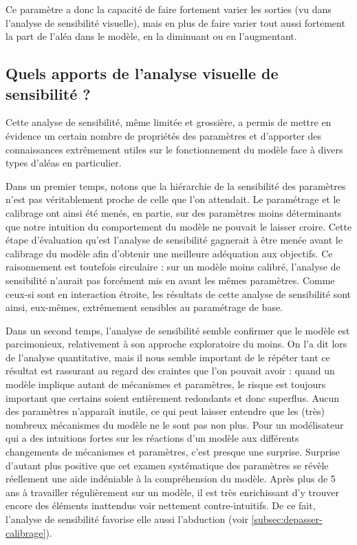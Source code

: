 Ce paramètre a donc la capacité de faire fortement varier les sorties (vu dans l'analyse de sensibilité visuelle), mais en plus de faire varier tout aussi fortement la part de l'aléa dans le modèle, en la diminuant ou en l'augmentant.

\subsection{Quels apports de l'analyse visuelle de sensibilité ?}

Cette analyse de sensibilité, même limitée et grossière, a permis de mettre en évidence un certain nombre de propriétés des paramètres et d'apporter des connaissances extrêmement utiles sur le fonctionnement du modèle face à divers types d'aléas en particulier.

Dans un premier temps, notons que la hiérarchie de la sensibilité des paramètres n'est pas véritablement proche de celle que l'on attendait.
Le paramétrage et le calibrage ont ainsi été menés, en partie, sur des paramètres moins déterminants que notre intuition du comportement du modèle ne pouvait le laisser croire.
Cette étape d'évaluation qu'est l'analyse de sensibilité gagnerait à être menée avant le calibrage du modèle afin d'obtenir une meilleure adéquation aux objectifs.
Ce raisonnement est toutefois circulaire : sur un modèle moins calibré, l'analyse de sensibilité n'aurait pas forcément mis en avant les mêmes paramètres.
Comme ceux-si sont en interaction étroite, les résultats de cette analyse de sensibilité sont ainsi, eux-mêmes, extrêmement sensibles au paramétrage de base.

Dans un second temps, l'analyse de sensibilité semble confirmer que le modèle est parcimonieux, relativement à son approche exploratoire du moins.
On l'a dit lors de l'analyse quantitative, mais il nous semble important de le répéter tant ce résultat est rassurant au regard des craintes que l'on pouvait avoir : quand un modèle implique autant de mécanismes et paramètres, le risque est toujours important que certains soient entièrement redondants et donc superflus.
Aucun des paramètres n'apparaît inutile, ce qui peut laisser entendre que les (très) nombreux mécanismes du modèle ne le sont pas non plus.
Pour un modélisateur qui a des intuitions fortes sur les réactions d'un modèle aux différents changements de mécanismes et paramètres, c'est presque une surprise.
Surprise d'autant plus positive que cet examen systématique des paramètres se révèle réellement une aide indéniable à la compréhension du modèle.
Après plus de 5 ans à travailler régulièrement sur un modèle, il est très enrichissant d'y trouver encore des éléments inattendus voir nettement contre-intuitifs.
De ce fait, l'analyse de sensibilité favorise elle aussi l'abduction (voir \cref{subsec:depasser-calibrage}).

